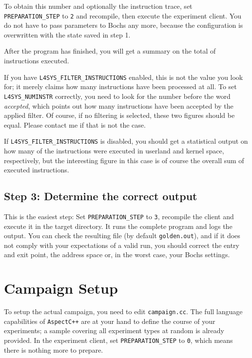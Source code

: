 \documentclass[a4paper,10pt]{article}
\begin{document}
To obtain this number and optionally the instruction trace,
set \verb+PREPARATION_STEP+ to \texttt{2} and recompile, then execute
the experiment client. You do not have to pass parameters to Bochs
any more, because the configuration is overwritten with the
state saved in step 1.

After the program has finished, you will get a summary on the
total of instructions executed.

If you have
\verb+L4SYS_FILTER_INSTRUCTIONS+ enabled, this is not the
value you look for; it merely claims how many
instructions have been processed at all.
To set \verb+L4SYS_NUMINSTR+ correctly, you need to look for the
number before the word \emph{accepted}, which points out how many
instructions have been accepted by the applied filter. Of course,
if no filtering is selected, these two figures should be equal.
Please contact me if that is not the case.

If \verb+L4SYS_FILTER_INSTRUCTIONS+ is disabled, you should
get a statistical output on how many of the instructions
were executed in userland and kernel space, respectively,
but the interesting figure in this case is of course the overall
sum of executed instructions.

\subsection{Step 3: Determine the correct output}

This is the easiest step: Set \verb+PREPARATION_STEP+ to \texttt{3},
recompile the client and execute it in the target directory.
It runs the complete program and logs the output. You can
check the resulting file (by default \texttt{golden.out}),
and if it does not comply with your expectations of a valid
run, you should correct the entry and exit point, the address space
or, in the worst case, your Bochs settings.

\section{Campaign Setup}

To setup the actual campaign, you need to edit \texttt{campaign.cc}.
The full language capabilities of \texttt{AspectC++} are at your hand to define
the course of your experiments; a sample covering all experiment
types at random is already provided. In the experiment client,
set \verb+PREPARATION_STEP+ to \texttt{0}, which means there is nothing more
to prepare.
\end{document}
